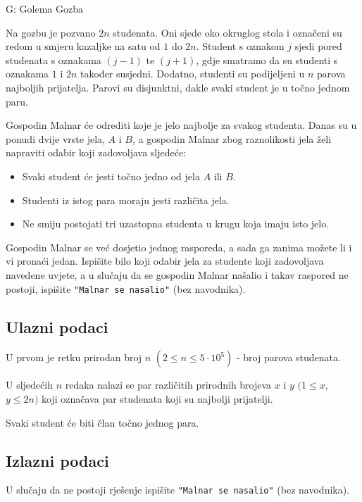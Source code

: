 \begin{statement}[
  timelimit=1 s,
  memorylimit=512 MiB,
]{G: Golema Gozba}

Na gozbu je pozvano $2n$ studenata. Oni sjede oko okruglog stola i označeni su
redom u smjeru kazaljke na satu od $1$ do $2n$. Student s oznakom $j$ sjedi
pored studenata s oznakama $(j - 1)$ te $(j + 1)$, gdje smatramo da su studenti
s oznakama $1$ i $2n$ također susjedni. Dodatno, studenti su podijeljeni u $n$
parova najboljih prijatelja. Parovi su disjunktni, dakle svaki student je u
točno jednom paru.

Gospodin Malnar će odrediti koje je jelo najbolje za svakog studenta. Danas su
u ponudi dvije vrste jela, $A$ i $B$, a gospodin Malnar zbog raznolikosti jela
želi napraviti odabir koji zadovoljava sljedeće:
\begin{itemize}
    \item Svaki student će jesti točno jedno od jela $A$ ili $B$.
    \item Studenti iz istog para moraju jesti različita jela.
    \item Ne smiju postojati tri uzastopna studenta u krugu koja imaju isto jelo.
\end{itemize}

Gospodin Malnar se već dosjetio jednog rasporeda, a sada ga zanima možete li i
vi pronaći jedan. Ispišite bilo koji odabir jela za studente koji zadovoljava
navedene uvjete, a u slučaju da se gospodin Malnar našalio i takav raspored ne
postoji, ispišite \texttt{"Malnar se nasalio"} (bez navodnika).

\subsection*{Ulazni podaci}
U prvom je retku prirodan broj $n$ $(2 \le n \le 5 \cdot 10^5)$ - broj parova
studenata.

U sljedećih $n$ redaka nalazi se par različitih prirodnih brojeva $x$ i $y$
$(1 \le x$, $y \le 2n)$ koji označava par studenata koji su najbolji prijatelji.

Svaki student će biti član točno jednog para.
\subsection*{Izlazni podaci}
U slučaju da ne postoji rješenje ispišite \texttt{"Malnar se nasalio"}
(bez navodnika).


\end{statement}
